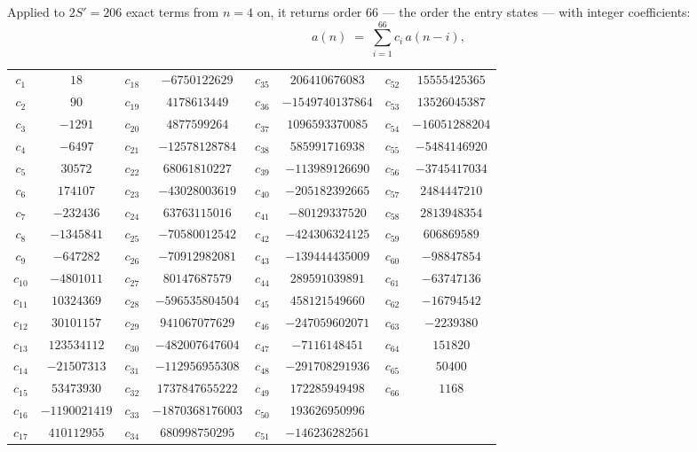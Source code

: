 \documentclass[11pt,a4paper]{article}
\theoremstyle{plain}
\theoremstyle{definition}
\begin{document}
Applied to $2S'=206$ exact terms from $n=4$ on, it returns order $66$ --- the
order the entry states --- with integer coefficients:
\[
a(n)\;=\;\sum_{i=1}^{66}c_i\,a(n-i),
\]
\begin{center}\small
\begin{tabular}{cccccccc}
$c_{1}$ & $18$ & $c_{18}$ & $-6750122629$ & $c_{35}$ & $206410676083$ & $c_{52}$ & $15555425365$ \\
$c_{2}$ & $90$ & $c_{19}$ & $4178613449$ & $c_{36}$ & $-1549740137864$ & $c_{53}$ & $13526045387$ \\
$c_{3}$ & $-1291$ & $c_{20}$ & $4877599264$ & $c_{37}$ & $1096593370085$ & $c_{54}$ & $-16051288204$ \\
$c_{4}$ & $-6497$ & $c_{21}$ & $-12578128784$ & $c_{38}$ & $585991716938$ & $c_{55}$ & $-5484146920$ \\
$c_{5}$ & $30572$ & $c_{22}$ & $68061810227$ & $c_{39}$ & $-113989126690$ & $c_{56}$ & $-3745417034$ \\
$c_{6}$ & $174107$ & $c_{23}$ & $-43028003619$ & $c_{40}$ & $-205182392665$ & $c_{57}$ & $2484447210$ \\
$c_{7}$ & $-232436$ & $c_{24}$ & $63763115016$ & $c_{41}$ & $-80129337520$ & $c_{58}$ & $2813948354$ \\
$c_{8}$ & $-1345841$ & $c_{25}$ & $-70580012542$ & $c_{42}$ & $-424306324125$ & $c_{59}$ & $606869589$ \\
$c_{9}$ & $-647282$ & $c_{26}$ & $-70912982081$ & $c_{43}$ & $-139444435009$ & $c_{60}$ & $-98847854$ \\
$c_{10}$ & $-4801011$ & $c_{27}$ & $80147687579$ & $c_{44}$ & $289591039891$ & $c_{61}$ & $-63747136$ \\
$c_{11}$ & $10324369$ & $c_{28}$ & $-596535804504$ & $c_{45}$ & $458121549660$ & $c_{62}$ & $-16794542$ \\
$c_{12}$ & $30101157$ & $c_{29}$ & $941067077629$ & $c_{46}$ & $-247059602071$ & $c_{63}$ & $-2239380$ \\
$c_{13}$ & $123534112$ & $c_{30}$ & $-482007647604$ & $c_{47}$ & $-7116148451$ & $c_{64}$ & $151820$ \\
$c_{14}$ & $-21507313$ & $c_{31}$ & $-112956955308$ & $c_{48}$ & $-291708291936$ & $c_{65}$ & $50400$ \\
$c_{15}$ & $53473930$ & $c_{32}$ & $1737847655222$ & $c_{49}$ & $172285949498$ & $c_{66}$ & $1168$ \\
$c_{16}$ & $-1190021419$ & $c_{33}$ & $-1870368176003$ & $c_{50}$ & $193626950996$ &  &  \\
$c_{17}$ & $410112955$ & $c_{34}$ & $680998750295$ & $c_{51}$ & $-146236282561$ &  &  \\
\end{tabular}
\end{center}
\end{document}
